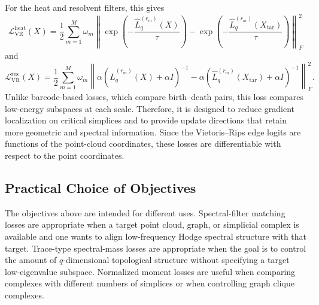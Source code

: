 \documentclass[pdflatex,sn-mathphys-ay]{sn-jnl}%
\theoremstyle{thmstyleone}%
\theoremstyle{thmstyletwo}%
\theoremstyle{thmstylethree}%
\begin{document}
For the heat and resolvent filters, this gives
\[
\mathcal{L}_{\mathrm{VR}}^{\mathrm{heat}}(X)
=
\frac{1}{2}
\sum_{m=1}^{M}
\omega_m
\left\|
\exp\left(
-\frac{\widehat{L}_q^{(r_m)}(X)}{\tau}
\right)
-
\exp\left(
-\frac{\widehat{L}_q^{(r_m)}(X_{\mathrm{tar}})}{\tau}
\right)
\right\|_F^2
\]
and
\[
\mathcal{L}_{\mathrm{VR}}^{\mathrm{res}}(X)
=
\frac{1}{2}
\sum_{m=1}^{M}
\omega_m
\left\|
\alpha
\left(
\widehat{L}_q^{(r_m)}(X)+\alpha I
\right)^{-1}
-
\alpha
\left(
\widehat{L}_q^{(r_m)}(X_{\mathrm{tar}})+\alpha I
\right)^{-1}
\right\|_F^2.
\]
Unlike barcode-based losses, which compare birth--death pairs, this loss compares low-energy subspaces at each scale.
Therefore, it is designed to reduce gradient localization on critical simplices and to provide update directions that retain more geometric and spectral information.
Since the Vietoris--Rips edge logits are functions of the point-cloud coordinates, these losses are differentiable with respect to the point coordinates.

\subsection{Practical Choice of Objectives}

The objectives above are intended for different uses. Spectral-filter matching losses are appropriate when a target point cloud, graph, or simplicial complex is available and one wants to align low-frequency Hodge spectral structure with that target. Trace-type spectral-mass losses are appropriate when the goal is to control the amount of \(q\)-dimensional topological structure without specifying a target low-eigenvalue subspace. Normalized moment losses are useful when comparing complexes with different numbers of simplices or when controlling graph clique complexes.
\end{document}

